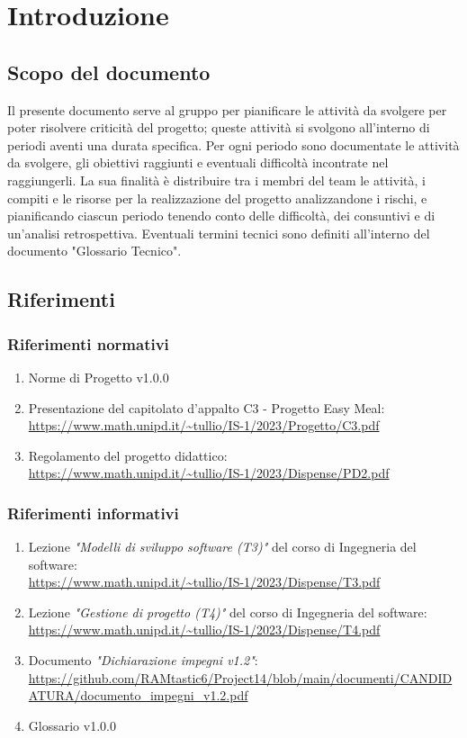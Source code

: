 \section{Introduzione}
\subsection{Scopo del documento}
Il presente documento serve al gruppo per pianificare le attività da svolgere per poter risolvere criticità del progetto; queste attività si svolgono all'interno di periodi aventi una durata specifica.
Per ogni periodo sono documentate le attività da svolgere, gli obiettivi raggiunti e eventuali difficoltà incontrate nel raggiungerli. La sua finalità è distribuire tra i membri del team le attività, i compiti e le risorse per la realizzazione del progetto analizzandone i rischi, e pianificando ciascun periodo tenendo conto delle difficoltà, dei consuntivi e di un'analisi retrospettiva. Eventuali termini tecnici sono definiti all'interno del documento "Glossario Tecnico".
\subsection{Riferimenti}
\subsubsection{Riferimenti normativi}
\begin{enumerate}
    \item Norme di Progetto v1.0.0
    \item Presentazione del capitolato d'appalto C3 - Progetto Easy Meal: \\ \url{https://www.math.unipd.it/~tullio/IS-1/2023/Progetto/C3.pdf}
    \item Regolamento del progetto didattico: \\ 
    \url{https://www.math.unipd.it/~tullio/IS-1/2023/Dispense/PD2.pdf}
\end{enumerate}
\subsubsection{Riferimenti informativi}
\label{sec:rif_inf}
\begin{enumerate}
    \item Lezione \emph{"Modelli di sviluppo software (T3)"} del corso di Ingegneria del software: \\
    \url{https://www.math.unipd.it/~tullio/IS-1/2023/Dispense/T3.pdf}
    \item Lezione \emph{"Gestione di progetto (T4)"} del corso di Ingegneria del software: \\
    \url{https://www.math.unipd.it/~tullio/IS-1/2023/Dispense/T4.pdf}
    \item Documento \emph{"Dichiarazione impegni v1.2"}: \\
    \url{https://github.com/RAMtastic6/Project14/blob/main/documenti/CANDIDATURA/documento_impegni_v1.2.pdf}
    \item Glossario v1.0.0
    
\end{enumerate}


